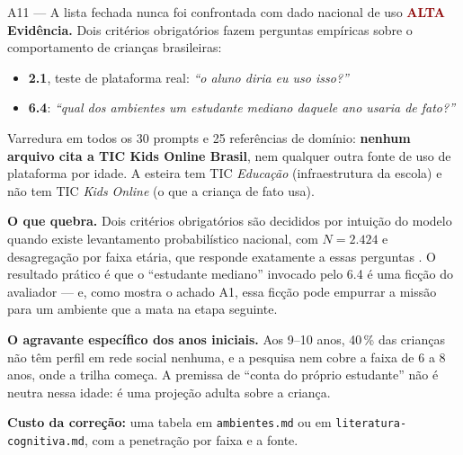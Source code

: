 \documentclass[11pt,a4paper]{article}
\newcommand{\sevalta}{\textcolor{DarkRed}{\textbf{ALTA}}}
\begin{document}
\begin{achadobox}{A11 --- A lista fechada nunca foi confrontada com dado nacional de uso \hfill \sevalta}
\textbf{Evid\^encia.} Dois crit\'erios obrigat\'orios fazem perguntas emp\'iricas sobre o
comportamento de crian\c{c}as brasileiras:

\begin{itemize}
  \item \textbf{2.1}, teste de plataforma real: \emph{``o aluno diria eu uso isso?''}
  \item \textbf{6.4}: \emph{``qual dos ambientes um estudante mediano daquele ano usaria de
        fato?''}
\end{itemize}

Varredura em todos os 30 prompts e 25 refer\^encias de dom\'inio: \textbf{nenhum arquivo cita a
TIC Kids Online Brasil}, nem qualquer outra fonte de uso de plataforma por idade. A esteira tem
TIC \emph{Educa\c{c}\~ao} (infraestrutura da escola) e n\~ao tem TIC \emph{Kids Online} (o que a
crian\c{c}a de fato usa).

\textbf{O que quebra.} Dois crit\'erios obrigat\'orios s\~ao decididos por intui\c{c}\~ao do
modelo quando existe levantamento probabil\'istico nacional, com $N = 2.424$ e desagrega\c{c}\~ao
por faixa et\'aria, que responde exatamente a essas perguntas \cite{tickids2024}. O resultado
pr\'atico \'e que o ``estudante mediano'' invocado pelo 6.4 \'e uma fic\c{c}\~ao do avaliador ---
e, como mostra o achado A1, essa fic\c{c}\~ao pode empurrar a miss\~ao para um ambiente que a mata
na etapa seguinte.

\textbf{O agravante espec\'ifico dos anos iniciais.} Aos 9--10 anos, 40\,\% das crian\c{c}as
n\~ao t\^em perfil em rede social nenhuma, e a pesquisa nem cobre a faixa de 6 a 8 anos, onde a
trilha come\c{c}a. A premissa de ``conta do pr\'oprio estudante'' n\~ao \'e neutra nessa idade:
\'e uma proje\c{c}\~ao adulta sobre a crian\c{c}a.

\textbf{Custo da corre\c{c}\~ao:} uma tabela em \texttt{ambientes.md} ou em
\texttt{literatura-cognitiva.md}, com a penetra\c{c}\~ao por faixa e a fonte.
\end{achadobox}
\end{document}
